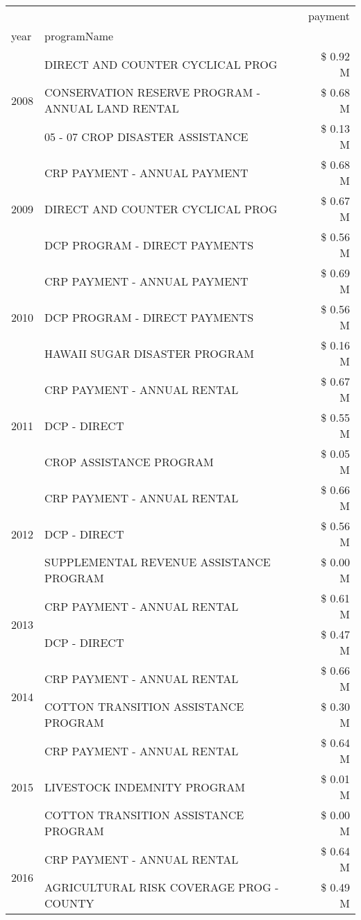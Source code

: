 \begin{tabular}{llr}
\toprule
 &  & payment \\
year & programName &  \\
\midrule
\multirow[t]{3}{*}{2008} & DIRECT AND COUNTER CYCLICAL PROG & \$ 0.92 M \\
 & CONSERVATION RESERVE PROGRAM - ANNUAL LAND RENTAL & \$ 0.68 M \\
 & 05 - 07 CROP DISASTER ASSISTANCE & \$ 0.13 M \\
\cline{1-3}
\multirow[t]{3}{*}{2009} & CRP PAYMENT - ANNUAL PAYMENT & \$ 0.68 M \\
 & DIRECT AND COUNTER CYCLICAL PROG & \$ 0.67 M \\
 & DCP PROGRAM - DIRECT PAYMENTS & \$ 0.56 M \\
\cline{1-3}
\multirow[t]{3}{*}{2010} & CRP PAYMENT - ANNUAL PAYMENT & \$ 0.69 M \\
 & DCP PROGRAM - DIRECT PAYMENTS & \$ 0.56 M \\
 & HAWAII SUGAR DISASTER PROGRAM & \$ 0.16 M \\
\cline{1-3}
\multirow[t]{3}{*}{2011} & CRP PAYMENT - ANNUAL RENTAL & \$ 0.67 M \\
 & DCP - DIRECT & \$ 0.55 M \\
 & CROP ASSISTANCE PROGRAM & \$ 0.05 M \\
\cline{1-3}
\multirow[t]{3}{*}{2012} & CRP PAYMENT - ANNUAL RENTAL & \$ 0.66 M \\
 & DCP - DIRECT & \$ 0.56 M \\
 & SUPPLEMENTAL REVENUE ASSISTANCE PROGRAM & \$ 0.00 M \\
\cline{1-3}
\multirow[t]{2}{*}{2013} & CRP PAYMENT - ANNUAL RENTAL & \$ 0.61 M \\
 & DCP - DIRECT & \$ 0.47 M \\
\cline{1-3}
\multirow[t]{2}{*}{2014} & CRP PAYMENT - ANNUAL RENTAL & \$ 0.66 M \\
 & COTTON TRANSITION ASSISTANCE PROGRAM & \$ 0.30 M \\
\cline{1-3}
\multirow[t]{3}{*}{2015} & CRP PAYMENT - ANNUAL RENTAL & \$ 0.64 M \\
 & LIVESTOCK INDEMNITY PROGRAM & \$ 0.01 M \\
 & COTTON TRANSITION ASSISTANCE PROGRAM & \$ 0.00 M \\
\cline{1-3}
\multirow[t]{3}{*}{2016} & CRP PAYMENT - ANNUAL RENTAL & \$ 0.64 M \\
 & AGRICULTURAL RISK COVERAGE PROG - COUNTY & \$ 0.49 M \\

\end{tabular}
